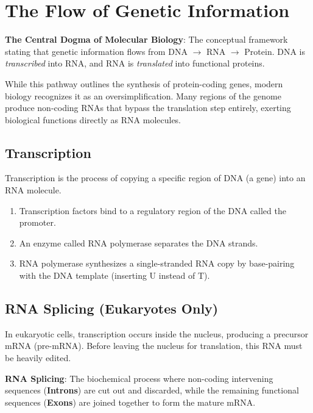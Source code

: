\section{The Flow of Genetic Information}

\begin{important}
  \textbf{The Central Dogma of Molecular Biology}: The conceptual framework stating that genetic information flows from DNA $\rightarrow$ RNA $\rightarrow$ Protein. DNA is \textit{transcribed} into RNA, and RNA is \textit{translated} into functional proteins.
\end{important}

While this pathway outlines the synthesis of protein-coding genes, modern biology recognizes it as an oversimplification. Many regions of the genome produce non-coding RNAs that bypass the translation step entirely, exerting biological functions directly as RNA molecules.


\subsection{Transcription}
Transcription is the process of copying a specific region of DNA (a gene) into an RNA molecule. 
\begin{enumerate}
  \item Transcription factors bind to a regulatory region of the DNA called the promoter.
  \item An enzyme called RNA polymerase separates the DNA strands.
  \item RNA polymerase synthesizes a single-stranded RNA copy by base-pairing with the DNA template (inserting U instead of T).
\end{enumerate}

\subsection{RNA Splicing (Eukaryotes Only)}
In eukaryotic cells, transcription occurs inside the nucleus, producing a precursor mRNA (pre-mRNA). Before leaving the nucleus for translation, this RNA must be heavily edited.

\begin{important}
  \textbf{RNA Splicing}: The biochemical process where non-coding intervening sequences (\textbf{Introns}) are cut out and discarded, while the remaining functional sequences (\textbf{Exons}) are joined together to form the mature mRNA.
\end{important}

